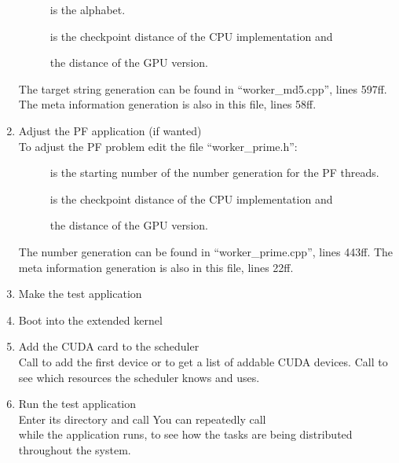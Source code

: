 \begin{enumerate}
\begin{description}
		\item[]  is the alphabet.
		\item[] is the checkpoint distance of the CPU implementation and
		\item[] the distance of the GPU version.
	\end{description}
	The target string generation
  can be found in ``worker\_md5.cpp'', lines 597ff.
  The meta information generation is also in this file, lines 58ff.
\item  Adjust the PF application (if wanted)\\
  To adjust the PF problem edit the file ``worker\_prime.h'':
	\begin{description}
		\item[] is the starting number of the number generation for the PF threads.
		\item[] is the checkpoint distance of the CPU implementation and 
		\item[] the distance of the GPU version.
	\end{description}
	The number generation
  can be found in ``worker\_prime.cpp'', lines 443ff.
  The meta information generation is also in this file, lines 22ff.
\item  Make the test application
\item  Boot into the extended kernel
\item  Add the CUDA card to the scheduler\\
  Call  to add the first device
  or  to get a list of addable
  CUDA devices. Call  to see which
  resources the scheduler knows and uses.
\item  Run the test application\\
  Enter its directory and call 
  You can repeatedly call \\  while
  the application runs, to see how the tasks are being distributed throughout
  the system.
\end{enumerate}

